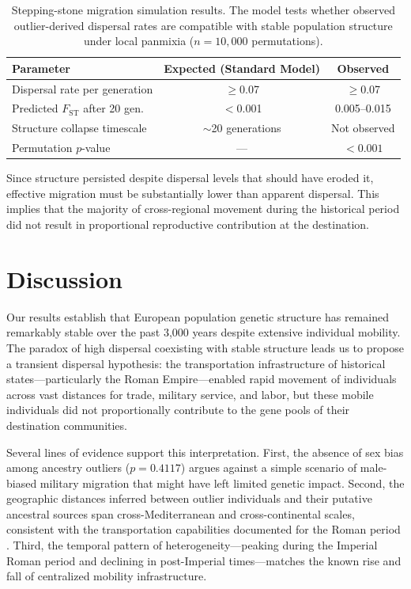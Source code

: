 \documentclass[11pt]{article}
\begin{document}
\begin{table}[H]
\centering
\caption{Stepping-stone migration simulation results. The model tests whether observed outlier-derived dispersal rates are compatible with stable population structure under local panmixia ($n = 10{,}000$ permutations).}
\label{tab:simulation_results}
\begin{tabular}{lcc}
\toprule
\textbf{Parameter} & \textbf{Expected (Standard Model)} & \textbf{Observed} \\
\midrule
Dispersal rate per generation & $\geq$0.07 & $\geq$0.07 \\
Predicted $F_{\text{ST}}$ after 20 gen. & $<$0.001 & 0.005--0.015 \\
Structure collapse timescale & $\sim$20 generations & Not observed \\
Permutation $p$-value & --- & $< 0.001$ \\
\bottomrule
\end{tabular}
\end{table}

Since structure persisted despite dispersal levels that should have eroded it, effective migration must be substantially lower than apparent dispersal. This implies that the majority of cross-regional movement during the historical period did not result in proportional reproductive contribution at the destination.

\section{Discussion}

Our results establish that European population genetic structure has remained remarkably stable over the past 3,000 years despite extensive individual mobility. The paradox of high dispersal coexisting with stable structure leads us to propose a transient dispersal hypothesis: the transportation infrastructure of historical states---particularly the Roman Empire---enabled rapid movement of individuals across vast distances for trade, military service, and labor, but these mobile individuals did not proportionally contribute to the gene pools of their destination communities.

Several lines of evidence support this interpretation. First, the absence of sex bias among ancestry outliers ($p = 0.4117$) argues against a simple scenario of male-biased military migration that might have left limited genetic impact. Second, the geographic distances inferred between outlier individuals and their putative ancestral sources span cross-Mediterranean and cross-continental scales, consistent with the transportation capabilities documented for the Roman period \citep{orbis, scheidel2019escape}. Third, the temporal pattern of heterogeneity---peaking during the Imperial Roman period and declining in post-Imperial times---matches the known rise and fall of centralized mobility infrastructure.
\end{document}
